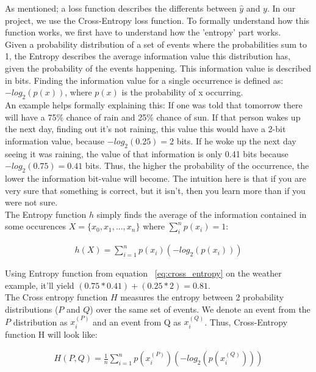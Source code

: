 As mentioned; a loss function describes the differents between $\hat{y}$ and $y$. In our project, we use the Cross-Entropy loss function. To formally understand how this function works, we first have to understand how the 'entropy' part works. \\

\noindent
Given a probability distribution of a set of events where the probabilities sum to 1, the Entropy describes the average information value this distribution has, given the probability of the events happening. This information value is described in bits. Finding the information value for a single occurrence is defined as: $-log_2(p(x))$, where $p(x)$ is the probability of x occurring.\\

\noindent
An example helps formally explaining this: If one was told that tomorrow there will have a 75\% chance of rain and 25\% chance of sun. If that person wakes up the next day, finding out it's not raining, this value this would have a 2-bit information value, because $-log_2(0.25) = 2$ bits. If he woke up the next day seeing it was raining, the value of that information is only 0.41 bits because $-log_2(0.75) = 0.41$ bits. Thus, the higher the probability of the occurrence, the lower the information bit-value will become. The intuition here is that if you are very sure that something is correct, but it isn't, then you learn more than if you were not sure.\\

\noindent
The Entropy function $h$ simply finds the average of the information contained in some occurences $X=\{x_0,x_1,...,x_n\}$ where $\sum^n_{i} p(x_i) = 1$:

\begin{align}
    h(X) = \sum^n_{i=1} p(x_i)(-log_2(p(x_i))) \label{eq:cross_entropy}
\end{align}

\noindent
Using Entropy function from equation ~\ref{eq:cross_entropy} on the weather example, it'll yield $(0.75 * 0.41) + (0.25 * 2) = 0.81$.\\

\noindent
The Cross entropy function $H$ measures the entropy between 2 probability distributions ($P$ and $Q$) over the same set of events. We denote an event from the $P$ distribution as $x_i^{(P)}$ and an event from Q as $x_i^{(Q)}$. Thus, Cross-Entropy function H will look like:

\begin{align}
    H(P,Q) = \frac{1}{n} \sum^n_{i=1} p(x_i^{(P)})(-log_2(p(x_i^{(Q)})))
\end{align}

